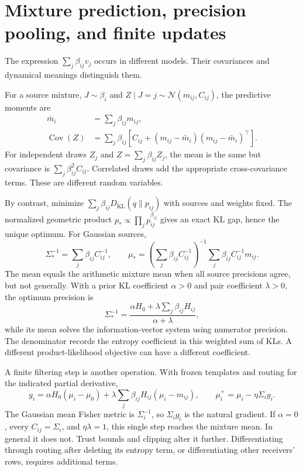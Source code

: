 \documentclass[11pt,letterpaper]{article}
\newcommand{\KL}{D_{\mathrm{KL}}}
\newcommand{\Cov}{\operatorname{Cov}}
\theoremstyle{remark}
\begin{document}
\section{Mixture prediction, precision pooling, and finite updates}
\label{sec:aggregation}
The expression $\sum_j\beta_{ij}v_j$ occurs in different models. Their covariances and dynamical meanings distinguish them.

For a source mixture, $J\sim\beta_i$ and $Z\mid J=j\sim\mathcal N(m_{ij},C_{ij})$, the predictive moments are
\begin{align}
 \bar m_i&=\sum_j\beta_{ij}m_{ij},\\
 \Cov(Z)&=\sum_j\beta_{ij}
 [C_{ij}+(m_{ij}-\bar m_i)(m_{ij}-\bar m_i)^\top].
 \label{eq:mixture}
\end{align}
For independent draws $Z_j$ and $Z=\sum_j\beta_{ij}Z_j$, the mean is the same but covariance is $\sum_j\beta_{ij}^2C_{ij}$. Correlated draws add the appropriate cross-covariance terms. These are different random variables.

By contrast, minimize $\sum_j\beta_{ij}\KL(q\|p_{ij})$ with sources and weights fixed. The normalized geometric product $p_*\propto\prod_jp_{ij}^{\beta_{ij}}$ gives an exact KL gap, hence the unique optimum. For Gaussian sources,
\begin{equation}
 \boxed{\Sigma_*^{-1}=\sum_j\beta_{ij}C_{ij}^{-1},\qquad
 \mu_*=\left(\sum_j\beta_{ij}C_{ij}^{-1}\right)^{-1}
 \sum_j\beta_{ij}C_{ij}^{-1}m_{ij}.}
 \label{eq:precision}
\end{equation}
The mean equals the arithmetic mixture mean when all source precisions agree, but not generally. With a prior KL coefficient $\alpha>0$ and pair coefficient $\lambda>0$, the optimum precision is
\begin{equation}
 \Sigma_*^{-1}=
 \frac{\alpha H_0+\lambda\sum_j\beta_{ij}H_{ij}}{\alpha+\lambda},
\end{equation}
while its mean solves the information-vector system using numerator precision. The denominator records the entropy coefficient in this weighted sum of KLs. A different product-likelihood objective can have a different coefficient.

A finite filtering step is another operation. With frozen templates and routing for the indicated partial derivative,
\begin{equation}
 g_i=\alpha H_0(\mu_i-\mu_0)
 +\lambda\sum_j\beta_{ij}H_{ij}(\mu_i-m_{ij}),\qquad
 \mu_i^+=\mu_i-\eta\Sigma_i g_i.
 \label{eq:ng}
\end{equation}
The Gaussian mean Fisher metric is $\Sigma_i^{-1}$, so $\Sigma_i g_i$ is the natural gradient. If $\alpha=0$, every $C_{ij}=\Sigma_i$, and $\eta\lambda=1$, this single step reaches the mixture mean. In general it does not. Trust bounds and clipping alter it further. Differentiating through routing after deleting its entropy term, or differentiating other receivers' rows, requires additional terms.
\end{document}
